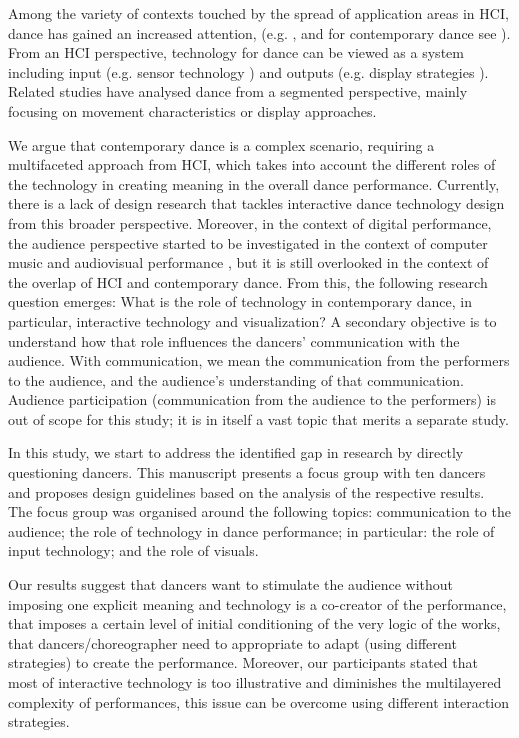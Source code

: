 Among the variety of contexts touched by the spread of application areas in HCI, dance has gained an increased attention, (e.g. \cite{fdili2017seeing}\cite{camurri2016dancer}, and for contemporary dance see \cite{dixon2007digital}). From an HCI perspective, technology for dance can be viewed as a system including input (e.g. sensor technology \cite{fdili2017seeing}) and outputs (e.g. display strategies \cite{hansen2013making}). Related studies have analysed dance from a segmented perspective, mainly focusing on movement characteristics or display approaches. 

We argue that contemporary dance is a complex scenario, requiring a multifaceted approach from HCI, which takes into account the different roles of the technology in creating meaning in the overall dance performance. Currently, there is a lack of design research that tackles interactive dance technology design from this broader perspective. Moreover, in the context of digital performance, the audience perspective started to be investigated in the context of computer music \cite{bin2017moment} and audiovisual performance \cite{correia2017role}, but it is still overlooked in the context of the overlap of HCI and contemporary dance. From this, the following research question emerges:
What is the role of technology in contemporary dance, in particular, interactive technology and visualization?
A secondary objective is to understand 
how that role influences the dancers' communication with the audience. With communication, we mean the communication from the performers to the audience, and the audience's understanding of that communication. Audience participation (communication from the audience to the performers) is out of scope for this study; it is in itself a vast topic that merits a separate study.

In this study, we start to address the identified gap in research by directly questioning dancers. This manuscript presents a focus group with ten dancers and proposes design guidelines based on the analysis of the respective results. The focus group was organised around the following topics: communication to the audience; the role of technology in dance performance; in particular: the role of input technology; and the role of visuals.  

Our results suggest that dancers want to stimulate the audience without imposing one explicit meaning and technology is a co-creator of the performance, that imposes a certain level of initial conditioning of the very logic of the works, that dancers/choreographer need to appropriate to adapt (using different strategies) to create the performance. Moreover, our participants stated that most of interactive technology is too illustrative and diminishes the multilayered complexity of performances, this issue can be overcome using different interaction strategies.

